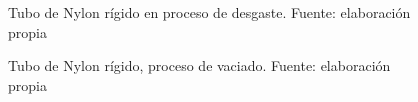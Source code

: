 \begin{figure}[h]
\centering
{}
\caption{Tubo de Nylon r\'igido en proceso de desgaste. Fuente: elaboración propia}
\label{fig:preparacion}
\end{figure}
 
\hfill
\begin{figure}[t]
\centering
{}
\caption{Tubo de Nylon r\'igido, proceso de vaciado. Fuente: elaboración propia}
\label{fig:preparacion}
\end{figure}

